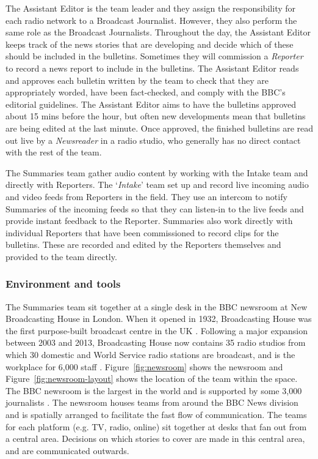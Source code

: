 The Assistant Editor is the team leader and they assign the responsibility for each radio network to a Broadcast
Journalist.  However, they also perform the same role as the Broadcast Journalists.  Throughout the day, the Assistant
Editor keeps track of the news stories that are developing and decide which of these should be included in the
bulletins. Sometimes they will commission a \textit{Reporter} to record a news report to include in the bulletins. The
Assistant Editor reads and approves each bulletin written by the team to check that they are appropriately worded, have
been fact-checked, and comply with the BBC's editorial guidelines.  The Assistant Editor aims to have the bulletins
approved about 15 mins before the hour, but often new developments mean that bulletins are being edited at the last
minute.  Once approved, the finished bulletins are read out live by a \textit{Newsreader} in a radio studio, who
generally has no direct contact with the rest of the team.

The Summaries team gather audio content by working with the Intake team and directly with Reporters. The
`\textit{Intake}' team set up and record live incoming audio and video feeds from Reporters in the field. They use an
intercom to notify Summaries of the incoming feeds so that they can listen-in to the live feeds and provide instant
feedback to the Reporter.  Summaries also work directly with individual Reporters that have been commissioned to record
clips for the bulletins. These are recorded and edited by the Reporters themselves and provided to the team directly.

\subsubsection{Environment and tools}
The Summaries team sit together at a single desk in the BBC newsroom at New Broadcasting House in London.  When it
opened in 1932, Broadcasting House was the first purpose-built broadcast centre in the UK \citep{Hines2008}.  Following
a major expansion between 2003 and 2013, Broadcasting House now contains 35 radio studios from which 30 domestic and
World Service radio stations are broadcast, and is the workplace for 6,000 staff \citep{BBCNews2013}.
Figure~\ref{fig:newsroom} shows the newsroom and Figure~\ref{fig:newsroom-layout} shows the location of the team within
the space. The BBC newsroom is the largest in the world and is supported by some 3,000 journalists
\citep[p.~80]{McLeish2015}.  The newsroom houses teams from around the BBC News division and is spatially arranged to
facilitate the fast flow of communication. The teams for each platform (e.g. TV, radio, online) sit together at desks
that fan out from a central area. Decisions on which stories to cover are made in this central area, and are
communicated outwards.

